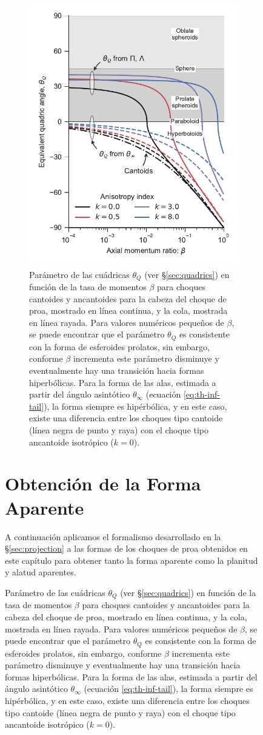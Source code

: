 \begin{figure}
\begin{figure}
  \centering
  \includegraphics[width=0.8\linewidth]{./Figures/ancantoid-angles}
  \caption{Parámetro de las cuádricas $\theta_Q$ (ver \S \ref{sec:quadrics}) en función de la tasa de momentos $\beta$ para choques cantoides y ancantoides para la cabeza del choque de proa, mostrado en línea continua, y la cola, mostrada en línea rayada. Para valores numéricos pequeños de $\beta$, se puede encontrar que el parámetro $\theta_Q$ es consistente con la forma de esferoides prolatos, sin embargo, conforme $\beta$ incrementa este parámetro disminuye y eventualmente hay una transición hacia formas hiperbólicas. Para la forma de las alas, estimada a partir del ángulo asintótico $\theta_\infty$ (ecuación \ref{eq:th-inf-tail}), la forma siempre es hipérbólica, y en este caso, existe una diferencia entre los choques tipo cantoide (línea negra de punto y raya) con el choque tipo ancantoide isotrópico ($k=0$).}
  \label{fig:thq-beta}
\end{figure}

\section[Forma Aparente]{Obtención de la Forma Aparente}

A continuación aplicamos el formalismo desarrollado en la \S \ref{sec:projection} a las formas de los choques de proa obtenidos en este capítulo para obtener tanto la forma aparente como la planitud y alatud aparentes.


\end{figure}
